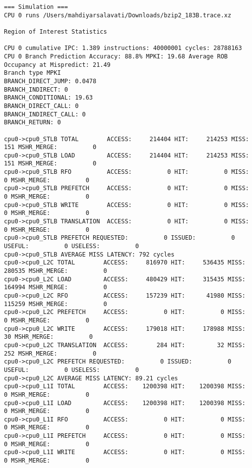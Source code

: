 \documentclass[17pt]{article}
\begin{document}
\begin{LTR}
\begin{lstlisting}[basicstyle=\tiny\ttfamily]
=== Simulation ===
CPU 0 runs /Users/mahdiyarsalavati/Downloads/bzip2_183B.trace.xz

Region of Interest Statistics

CPU 0 cumulative IPC: 1.389 instructions: 40000001 cycles: 28788163
CPU 0 Branch Prediction Accuracy: 88.8% MPKI: 19.68 Average ROB Occupancy at Mispredict: 21.49
Branch type MPKI
BRANCH_DIRECT_JUMP: 0.0478
BRANCH_INDIRECT: 0
BRANCH_CONDITIONAL: 19.63
BRANCH_DIRECT_CALL: 0
BRANCH_INDIRECT_CALL: 0
BRANCH_RETURN: 0

cpu0->cpu0_STLB TOTAL        ACCESS:     214404 HIT:     214253 MISS:        151 MSHR_MERGE:          0
cpu0->cpu0_STLB LOAD         ACCESS:     214404 HIT:     214253 MISS:        151 MSHR_MERGE:          0
cpu0->cpu0_STLB RFO          ACCESS:          0 HIT:          0 MISS:          0 MSHR_MERGE:          0
cpu0->cpu0_STLB PREFETCH     ACCESS:          0 HIT:          0 MISS:          0 MSHR_MERGE:          0
cpu0->cpu0_STLB WRITE        ACCESS:          0 HIT:          0 MISS:          0 MSHR_MERGE:          0
cpu0->cpu0_STLB TRANSLATION  ACCESS:          0 HIT:          0 MISS:          0 MSHR_MERGE:          0
cpu0->cpu0_STLB PREFETCH REQUESTED:          0 ISSUED:          0 USEFUL:          0 USELESS:          0
cpu0->cpu0_STLB AVERAGE MISS LATENCY: 792 cycles
cpu0->cpu0_L2C TOTAL        ACCESS:     816970 HIT:     536435 MISS:     280535 MSHR_MERGE:          0
cpu0->cpu0_L2C LOAD         ACCESS:     480429 HIT:     315435 MISS:     164994 MSHR_MERGE:          0
cpu0->cpu0_L2C RFO          ACCESS:     157239 HIT:      41980 MISS:     115259 MSHR_MERGE:          0
cpu0->cpu0_L2C PREFETCH     ACCESS:          0 HIT:          0 MISS:          0 MSHR_MERGE:          0
cpu0->cpu0_L2C WRITE        ACCESS:     179018 HIT:     178988 MISS:         30 MSHR_MERGE:          0
cpu0->cpu0_L2C TRANSLATION  ACCESS:        284 HIT:         32 MISS:        252 MSHR_MERGE:          0
cpu0->cpu0_L2C PREFETCH REQUESTED:          0 ISSUED:          0 USEFUL:          0 USELESS:          0
cpu0->cpu0_L2C AVERAGE MISS LATENCY: 89.21 cycles
cpu0->cpu0_L1I TOTAL        ACCESS:    1200398 HIT:    1200398 MISS:          0 MSHR_MERGE:          0
cpu0->cpu0_L1I LOAD         ACCESS:    1200398 HIT:    1200398 MISS:          0 MSHR_MERGE:          0
cpu0->cpu0_L1I RFO          ACCESS:          0 HIT:          0 MISS:          0 MSHR_MERGE:          0
cpu0->cpu0_L1I PREFETCH     ACCESS:          0 HIT:          0 MISS:          0 MSHR_MERGE:          0
cpu0->cpu0_L1I WRITE        ACCESS:          0 HIT:          0 MISS:          0 MSHR_MERGE:          0

\end{lstlisting}
\end{LTR}
\end{document}
